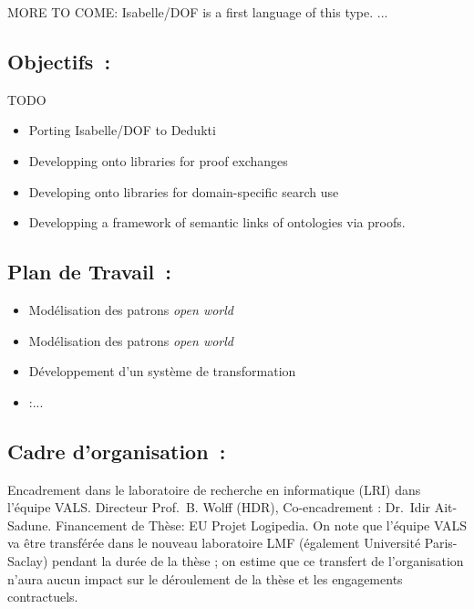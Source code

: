 \documentclass[a4paper,10pt]{article}
\begin{document}
MORE TO COME: Isabelle/DOF is a first language of this type. 
... 

\subsection*{Objectifs~:}

TODO

\begin{itemize}
\item
  Porting Isabelle/DOF to Dedukti
\item
  Developping onto libraries for proof exchanges
\item
  Developing onto libraries for domain-specific search use
\item
  Developping a framework of semantic links of ontologies via proofs.
\end{itemize}

\subsection*{Plan de Travail~:}
\begin{itemize}
  \item
    Modélisation des patrons \emph{open world}
  \item
    Modélisation des patrons \emph{open world}
  \item
    Développement d'un système de transformation
  \item :...
\end{itemize}

\subsection*{Cadre d'organisation~:}
Encadrement dans le laboratoire de recherche en informatique (LRI)
dans l'équipe VALS\@.
Directeur Prof.\ B. Wolff (HDR), Co-encadrement : Dr.\ Idir Ait-Sadune.
Financement de Thèse: EU Projet Logipedia.
On note que l'équipe VALS va être transférée
dans le nouveau laboratoire LMF (également Université Paris-Saclay)
pendant la durée de la thèse ;
on estime que ce transfert de l'organisation n'aura aucun impact
sur le déroulement de la thèse et les engagements contractuels.



\end{document}
